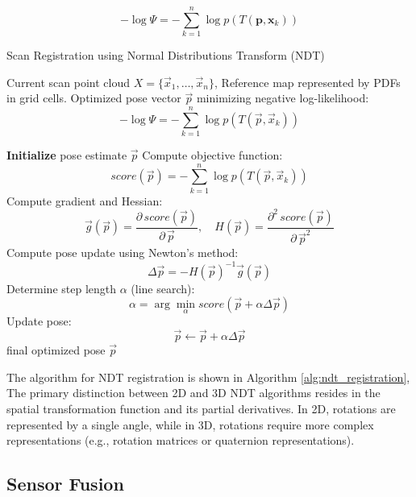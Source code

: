 \begin{equation}
-\log \Psi = -\sum_{k=1}^{n} \log p(T(\mathbf{p}, \mathbf{x}_k))
\end{equation}

    \begin{algorithm}[htbp]
    \caption{Scan Registration using Normal Distributions Transform (NDT)}
    \label{alg:ndt_registration}
    \begin{algorithmic}[1]
        \Require Current scan point cloud $X = \{\vec{x}_1, \dots, \vec{x}_n\}$, Reference map represented by PDFs in grid cells.
        \Ensure Optimized pose vector $\vec{p}$ minimizing negative log-likelihood:
        \[
        -\log \Psi = -\sum_{k=1}^{n} \log p\left(T(\vec{p}, \vec{x}_k)\right)
        \]
    
        \State \textbf{Initialize} pose estimate $\vec{p}$
        \Repeat
        \State Compute objective function:
            \[
            score(\vec{p}) = -\sum_{k=1}^{n}\log p\left(T(\vec{p}, \vec{x}_k)\right)
            \]
        \State Compute gradient and Hessian:
            \[
            \vec{g}(\vec{p}) = \frac{\partial\, score(\vec{p})}{\partial\,\vec{p}}, \quad H(\vec{p}) = \frac{\partial^2\, score(\vec{p})}{\partial\,\vec{p}^2}
            \]
        \State Compute pose update using Newton's method:
            \[
            \Delta\vec{p} = -H(\vec{p})^{-1}\vec{g}(\vec{p})
            \]
        \State Determine step length $\alpha$ (line search):
            \[
            \alpha = \arg\min_{\alpha} score(\vec{p} + \alpha \Delta\vec{p})
            \]
        \State Update pose:
            \[
            \vec{p} \leftarrow \vec{p} + \alpha \Delta\vec{p}
            \]
        \State \Return final optimized pose $\vec{p}$
    \end{algorithmic}
    \end{algorithm}

The algorithm for NDT registration is shown in Algorithm \ref{alg:ndt_registration}, The primary distinction between 2D and 3D NDT algorithms resides in the spatial transformation function and its partial derivatives. In 2D, rotations are represented by a single angle, while in 3D, rotations require more complex representations (e.g., rotation matrices or quaternion representations).

\subsection{Sensor Fusion}

